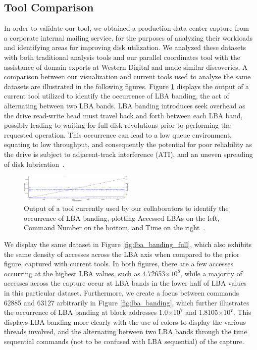 \documentclass[journal]{vgtc}                %
\providecommand{\e}[1]{\ensuremath{\times 10^{#1}}}
\begin{document}
\subsection{Tool Comparison}
In order to validate our tool, we obtained a production data center capture from a corporate internal mailing service, for the purposes of analyzing their workloads and identifying areas for improving disk utilization. We analyzed these datasets with both traditional analysis tools and our parallel coordinates tool with the assistance of domain experts at Western Digital and made similar discoveries. A comparison between our visualization and current tools used to analyze the same datasets are illustrated in the following figures. Figure \ref{fig:prev_tool} displays the output of a current tool utilized to identify the occurrence of LBA banding, the act of alternating between two LBA bands. LBA banding introduces seek overhead as the drive read-write head must travel back and forth between each LBA band, possibly leading to waiting for full disk revolutions prior to performing the requested operation. This occurrence can lead to a low queue environment, equating to low throughput, and consequently the potential for poor reliability as the drive is subject to adjacent-track interference (ATI), and an uneven spreading of disk lubrication~\cite{internal:collab}. 

\begin{figure}[h!]
 \centering
 \includegraphics[width=0.5\textwidth]{images/prev_tool.eps}
 \caption[Output of a tool currently used to identify LBA banding.]{Output of a tool currently used by our collaborators to identify the occurrence of LBA banding, plotting Accessed LBAs on the left, Command Number on the bottom, and Time on the right~\cite{internal:collab}.}
 \label{fig:prev_tool}
\end{figure}

We display the same dataset in Figure \ref{fig:lba_banding_full}, which also exhibits the same density of accesses across the LBA axis when compared to the prior figure, captured with current tools. In both figures, there are a few accesses occurring at the highest LBA values, such as 4.72653\e{8}, while a majority of accesses across the capture occur at LBA bands in the lower half of LBA values in this particular dataset. Furthermore, we create a focus between commands 62885 and 63127 arbitrarily in Figure \ref{fig:lba_banding}, which further illustrates the occurrence of LBA banding at block addresses 1.0\e{7} and 1.8105\e{7}. This displays LBA banding more clearly with the use of colors to display the various threads involved, and the alternating between two LBA bands through the time sequential commands (not to be confused with LBA sequential) of the capture.
\end{document}
